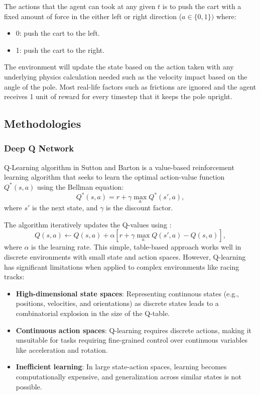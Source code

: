 \documentclass{article}
\begin{document}
The actions that the agent can took at any given $t$ is to push the cart with a
fixed amount of force in the either left or right direction ($a \in \{0, 1\})$
where:
\begin{itemize}
  \item 0: push the cart to the left.
  \item 1: push the cart to the right.
\end{itemize}

The environment will update the state based on the action taken with any
underlying physics calculation needed such as the velocity impact based on the
angle of the pole. Most real-life factors such as frictions are ignored and the
agent receives 1 unit of reward for every timestep that it keeps the pole
upright.

\subsection{Methodologies}
\subsubsection{Deep Q Network}

Q-Learning algorithm in Sutton and Barton is a value-based reinforcement learning algorithm that seeks to learn the optimal action-value function \(Q^*(s, a)\) using the Bellman equation:
\[
Q^*(s, a) = r + \gamma \max_a Q^*(s', a),
\]
where \(s'\) is the next state, and \(\gamma\) is the discount factor.

The algorithm iteratively updates the Q-values using \cite{sutton-barton-rl}:
\[
Q(s, a) \leftarrow Q(s, a) + \alpha \left[ r + \gamma \max_a Q(s', a) - Q(s, a) \right],
\]
where \(\alpha\) is the learning rate. This simple, table-based approach works well in discrete environments with small state and action spaces. However, Q-learning has significant limitations when applied to complex environments like racing tracks:
\begin{itemize}
    \item \textbf{High-dimensional state spaces}: Representing continuous states (e.g., positions, velocities, and orientations) as discrete states leads to a combinatorial explosion in the size of the Q-table.
    \item \textbf{Continuous action spaces}: Q-learning requires discrete actions, making it unsuitable for tasks requiring fine-grained control over continuous variables like acceleration and rotation.
    \item \textbf{Inefficient learning}: In large state-action spaces, learning becomes computationally expensive, and generalization across similar states is not possible.
\end{itemize}
\end{document}
